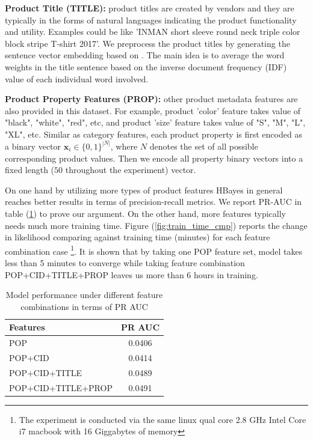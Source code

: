 \textbf{Product Title (TITLE):} product titles are created by vendors and they are typically in the forms of natural languages indicating the product functionality and utility.  Examples could be like 'INMAN short sleeve round neck triple color block stripe T-shirt 2017'.  We preprocess the product titles by generating the sentence vector embedding based on \cite{de2016representation}.  The main idea is to average the word weights in the title sentence based on the inverse document frequency (IDF) value of each individual word involved.

\textbf{Product Property Features (PROP):} other product metadata features are also provided in this dataset. For example,  product 'color' feature takes value of "black", "white", "red", etc, and product 'size' feature takes value of "S", "M", "L", "XL", etc.  Similar as category features, each product property is first encoded as a binary vector $\bm{x}_i \in \{0, 1\}^{|N|}$, where $N$ denotes the set of all possible corresponding product values.  Then we encode all property binary vectors into a fixed length ($50$ throughout the experiment) vector. %

On one hand by utilizing more types of product features HBayes in general reaches better results in terms of precision-recall metrics.  We report PR-AUC in table (\ref{tab:features_cmp}) to prove our argument.   On the other hand, more features typically needs much more training time.  Figure (\ref{fig:train_time_cmp}) reports the change in likelihood comparing against training time (minutes) for each feature combination case \footnote{The experiment is conducted via the same linux qual core 2.8 GHz Intel Core i7 macbook with 16 Giggabytes of memory}.   It is shown that by taking one POP feature set, model takes less than 5 minutes to converge while taking feature combination POP+CID+TITLE+PROP leaves us more than 6 hours in training.   

\begin{table}[htb]
\centering
\begin{tabular}{l|c}
\toprule
\textbf{Features} & \textbf{PR AUC} \\
\hline
POP & 0.0406 \\
\rowcolor{mygray}
POP+CID & 0.0414 \\
POP+CID+TITLE & 0.0489 \\
\rowcolor{mygray}
POP+CID+TITLE+PROP & 0.0491 \\
\bottomrule
\end{tabular}
\caption{Model performance under different feature combinations in terms of PR AUC}
\label{tab:features_cmp}
\end{table}



